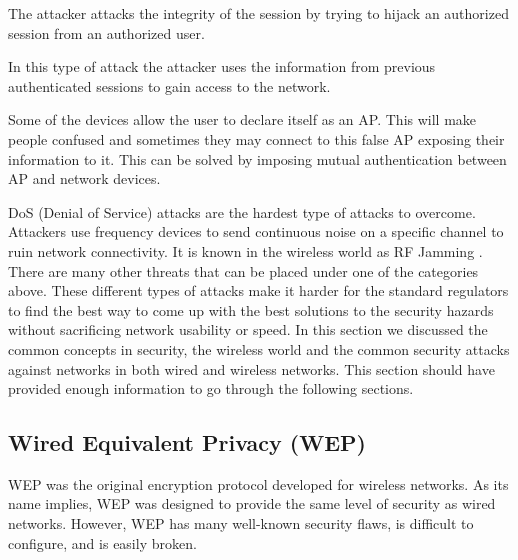 \documentclass[a4paper,12pt,pagesize,headsepline,bibtotoc,titlepage]{scrartcl}
\begin{document}
The attacker attacks the integrity of the session by trying to hijack an authorized session from an authorized user.


In this type of attack the attacker uses the information from previous authenticated sessions to gain access to the network.


Some of the devices allow the user to declare itself as an AP. This will make people confused and sometimes they may connect to this false AP exposing their information to it. This can be solved by imposing mutual authentication between AP and network devices.


DoS (Denial of Service) attacks are the hardest type of attacks to overcome. Attackers use frequency devices to send continuous noise on a specific channel to ruin network connectivity. It is known in the wireless world as RF Jamming \cite{welch}.
\\  
  
  
There are many other threats that can be placed under one of the categories above. These different types of attacks make it harder for the standard regulators to find the best way to come up with the best solutions to the security hazards without sacrificing network usability or speed. In this section we discussed the common concepts in security, the wireless world and the common security attacks against networks in both wired and wireless networks. This section should have provided enough information to go through the following sections.

\subsection{Wired Equivalent Privacy (WEP)}
WEP was the original encryption protocol developed for wireless networks. As its name implies, WEP was designed to provide the same level of security as wired networks. However, WEP has many well-known security flaws, is difficult to configure, and is easily broken.
\end{document}
